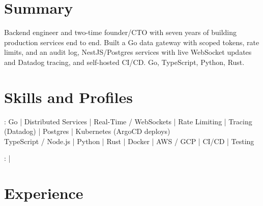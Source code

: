 \documentclass[print]{jack-resume}
\begin{document}
\pagecolor{darkmodeBackground}


\begin{minipage}[t][1cm][t]{.03\textwidth}
    \hfill
\end{minipage}

\section{Summary}
Backend engineer and two-time founder/CTO with seven years of building production services end to end. Built a Go data gateway with scoped tokens, rate limits, and an audit log, NestJS/Postgres services with live WebSocket updates and Datadog tracing, and self-hosted CI/CD. Go, TypeScript, Python, Rust.
\sectionsep

\section{Skills and Profiles}
:
Go \hfill | \hfill
Distributed Services \hfill | \hfill
Real-Time / WebSockets \hfill | \hfill
Rate Limiting \hfill | \hfill
Tracing (Datadog) \hfill | \hfill
Postgres \hfill | \hfill
Kubernetes (ArgoCD deploys) \\
\hspace{1.0cm} TypeScript / Node.js \hfill | \hfill
Python \hfill | \hfill
Rust \hfill | \hfill
Docker \hfill | \hfill
AWS / GCP \hfill | \hfill
CI/CD \hfill | \hfill
Testing \\

\raggedright{
    :
      \href{https://www.linkedin.com/in/jack-sturtevant/}{ \ExternalLink} |
     \href{https://github.com/jacksturt}{ \ExternalLink}}

\section{Experience}
\end{document}
